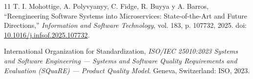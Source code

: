 \documentclass[10pt,a4paper]{article}
\begin{document}
\begin{thebibliography}{11}
T. I. Mohottige, A. Polyvyanyy, C. Fidge, R. Buyya y A. Barros, ``Reengineering Software
Systems into Microservices: State-of-the-Art and Future Directions,'' \emph{Information and
Software Technology}, vol. 183, p. 107732, 2025.
doi: \href{https://doi.org/10.1016/j.infsof.2025.107732}{10.1016/j.infsof.2025.107732}.

International Organization for Standardization, \emph{ISO/IEC 25010:2023 Systems and
Software Engineering --- Systems and Software Quality Requirements and Evaluation (SQuaRE)
--- Product Quality Model}. Geneva, Switzerland: ISO, 2023.

\end{thebibliography}
\end{document}
